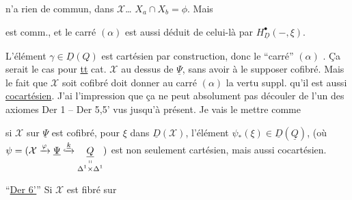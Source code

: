 n'a rien de commun, dans $\mathcal X$\ldots{} $X_a\cap X_b=\phi$. Mais


est comm., et le carré $(\alpha)$ est aussi déduit de
celui-là par $H^\bullet_{\underline D}(-,\xi)$.

L'élément $\gamma\in\underline D(Q)$ est cartésien par construction, donc le ``carré'' $(\alpha)$ . Ça serait le cas pour \uline{tt} cat. $\mathcal X$  au dessus de $\underline\Psi$, sans avoir à le supposer cofibré. Mais le fait que $\mathcal X$ soit cofibré doit donner au carré $(\alpha)$ la vertu suppl. qu'il est aussi \uline{cocartésien}. J'ai l'impression que ça ne peut absolument pas découler de l'un des axiomes Der 1 -- Der 5,5' vus jusqu'à présent. Je vais le mettre comme

   si $\mathcal X$ sur $\underline\Psi$ est cofibré, pour $\xi$    dans $\underline D(\mathcal X)$,  l'élément $\psi_*(\xi)\in\underline D(\underline Q)$, (où $\psi=(\mathcal X\xrightarrow{\varphi}\underline\Psi\lhook\joinrel\xrightarrow{\underline k}\underset{\substack{\shortparallel\\\Delta^1\times\Delta^1}}{\underline Q})$ est non seulement cartésien, mais aussi cocartésien.




``\uline{Der 6'}'' Si $\mathcal X$ est fibré sur


